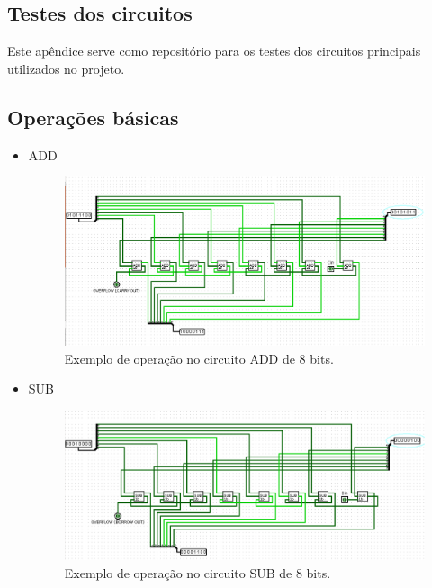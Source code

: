 \documentclass[
	12pt,				%
	openright,			%
	twoside,			%
	a4paper,			%
	english,			%
	french,				%
	spanish,			%
	brazil,				%
	]{abntex2}
\begin{document}
\begin{apendicesenv}

\chapter{Testes dos circuitos}\label{apendiceA}

Este apêndice serve como repositório para os testes dos circuitos principais utilizados no projeto.

\section{Operações básicas}
\begin{itemize}

\item {ADD}

\begin{figure}[H]
	\begin{center}
	    \includegraphics[scale=0.38]{imagens/add8bteste.png}
	\end{center}
\caption{\label{addteste}Exemplo de operação no circuito ADD de 8 bits.}
\end{figure}

\item {SUB}

\begin{figure}[H]
	\begin{center}
	    \includegraphics[scale=0.4]{imagens/subtratorcompleto.png}
	\end{center}
\caption{\label{subteste}Exemplo de operação no circuito SUB de 8 bits.}
\end{figure}


\end{itemize}
\end{apendicesenv}
\end{document}
